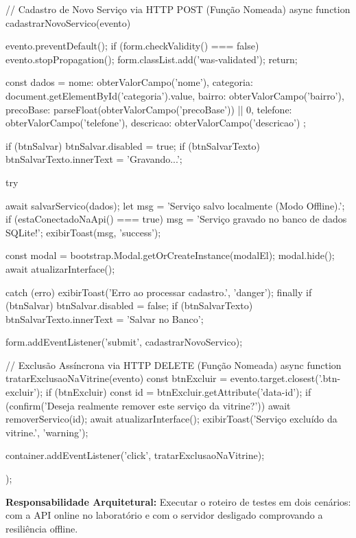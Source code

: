 \begin{boxCodigoJS}[main.js]
{  // Cadastro de Novo Serviço via HTTP POST (Função Nomeada)
  async function cadastrarNovoServico(evento) {
    evento.preventDefault();
    if (form.checkValidity() === false) {
      evento.stopPropagation();
      form.classList.add('was-validated');
      return;
    }

    const dados = {
      nome: obterValorCampo('nome'),
      categoria: document.getElementById('categoria').value,
      bairro: obterValorCampo('bairro'),
      precoBase: parseFloat(obterValorCampo('precoBase')) || 0,
      telefone: obterValorCampo('telefone'),
      descricao: obterValorCampo('descricao')
    };

    if (btnSalvar) btnSalvar.disabled = true;
    if (btnSalvarTexto) btnSalvarTexto.innerText = 'Gravando...';

    try {
      await salvarServico(dados);
      let msg = 'Serviço salvo localmente (Modo Offline).';
      if (estaConectadoNaApi() === true) {
        msg = 'Serviço gravado no banco de dados SQLite!';
      }
      exibirToast(msg, 'success');

      const modal = bootstrap.Modal.getOrCreateInstance(modalEl);
      modal.hide();
      await atualizarInterface();
    } catch (erro) {
      exibirToast('Erro ao processar cadastro.', 'danger');
    } finally {
      if (btnSalvar) btnSalvar.disabled = false;
      if (btnSalvarTexto) btnSalvarTexto.innerText = 'Salvar no Banco';
    }
  }

  form.addEventListener('submit', cadastrarNovoServico);

  // Exclusão Assíncrona via HTTP DELETE (Função Nomeada)
  async function tratarExclusaoNaVitrine(evento) {
    const btnExcluir = evento.target.closest('.btn-excluir');
    if (btnExcluir) {
      const id = btnExcluir.getAttribute('data-id');
      if (confirm('Deseja realmente remover este serviço da vitrine?')) {
        await removerServico(id);
        await atualizarInterface();
        exibirToast('Serviço excluído da vitrine.', 'warning');
      }
    }
  }

  container.addEventListener('click', tratarExclusaoNaVitrine);
});
\end{boxCodigoJS}

\begin{boxAtividade}
\textbf{Responsabilidade Arquitetural:} Executar o roteiro de testes em dois cenários: com a API online no laboratório e com o servidor desligado comprovando a resiliência offline.
\end{boxAtividade}

